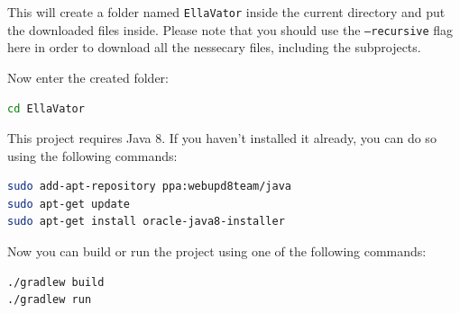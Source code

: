 \documentclass[a4paper, 12pt]{article}
\begin{document}
This will create a folder named \texttt{EllaVator} inside the current directory and put the downloaded files inside.
Please note that you should use the \texttt{--recursive} flag here in order to download all the nessecary files, including the subprojects.

Now enter the created folder:
\begin{lstlisting}[language=bash]
cd EllaVator
\end{lstlisting}

This project requires Java 8. If you haven't installed it already, you can do so using the following commands:
\begin{lstlisting}[language=bash]
sudo add-apt-repository ppa:webupd8team/java
sudo apt-get update
sudo apt-get install oracle-java8-installer
\end{lstlisting}

Now you can build or run the project using one of the following commands:
\begin{lstlisting}[language=bash]
./gradlew build
./gradlew run
\end{lstlisting}
\end{document}
